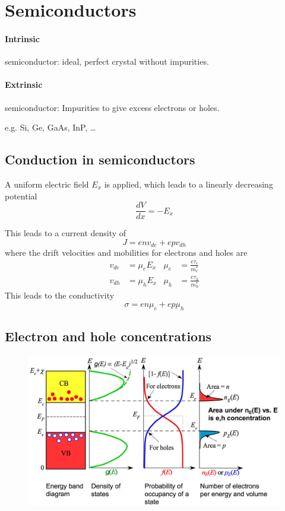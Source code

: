 \section{Semiconductors}
\paragraph{Intrinsic} semiconductor: ideal, perfect crystal without impurities.
\paragraph{Extrinsic} semiconductor: Impurities to give excess electrons or holes.

e.g. Si, Ge, GaAs, InP, \ldots

\subsection{Conduction in semiconductors}
A uniform electric field $E_x$ is applied, which leads to a linearly decreasing potential
\begin{equation}
    \frac{dV}{dx} = -E_x
\end{equation}


This leads to a current density of
\begin{equation}
    J = e n v_{de} + e p v_{dh}
\end{equation}
where the drift velocities and mobilities for electrons and holes are
\begin{align*}
    v_{de} &= \mu_e E_x & \mu_e &= \frac{e \tau_e}{m_e^*} \\
    v_{dh} &= \mu_h E_x & \mu_h &= \frac{e \tau_h}{m_h^*}
\end{align*}
This leads to the conductivity
\begin{equation}
    \sigma = e n \mu_e + e p \mu_h
\end{equation}

\subsection{Electron and hole concentrations}
\begin{figure}[ht!]
    \centering
    \includegraphics[width=0.6\linewidth]{images/semicond_elec_hole_concentration.jpg}
\end{figure}

